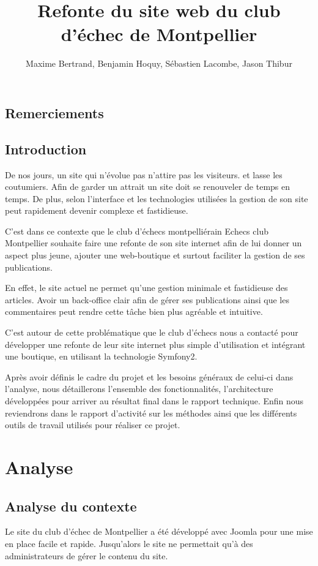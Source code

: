 \documentclass[a4paper,11pt]{report}
\title{Refonte du site web du club d'échec de Montpellier}
\author{Maxime Bertrand, Benjamin Hoquy, Sébastien Lacombe, Jason Thibur}
\begin{document}
\newpage

\renewcommand{\contentsname}{Sommaire}
\renewcommand{\chaptername}{}

\maketitle
\tableofcontents

\chapter*{Remerciements}

\chapter*{Introduction}
De nos jours, un site qui n’évolue pas n’attire pas les visiteurs. et lasse les coutumiers. Afin de garder un attrait un site doit se renouveler de temps en temps. De plus, selon l’interface et les technologies utilisées la gestion de son site peut rapidement devenir complexe et fastidieuse.

C’est dans ce contexte que le club d’échecs montpelliérain Echecs club Montpellier souhaite faire une refonte de son site internet afin de lui donner un aspect plus jeune, ajouter une web-boutique et surtout faciliter la gestion de ses publications.

En effet, le site actuel ne permet qu’une gestion minimale et fastidieuse des articles. Avoir un back-office clair afin de gérer ses publications ainsi que les commentaires peut rendre cette tâche bien plus agréable et intuitive.

C’est autour de cette problématique que le club d’échecs nous a contacté pour développer une refonte de leur site internet plus simple d’utilisation et intégrant une boutique, en utilisant la technologie Symfony2.

Après avoir définis le cadre du projet et les besoins généraux de celui-ci dans l’analyse, nous détaillerons l’ensemble des fonctionnalités, l’architecture développées pour arriver au résultat final dans le rapport technique. Enfin nous reviendrons dans le rapport d’activité sur les méthodes ainsi que les différents outils de travail utilisés pour réaliser ce projet.

\part{Analyse}
\chapter{Analyse du contexte}
Le site du club d’échec de Montpellier a été développé avec Joomla pour une mise en place facile et rapide.
Jusqu’alors le site ne permettait qu’à des administrateurs de gérer le contenu du site.
\end{document}
